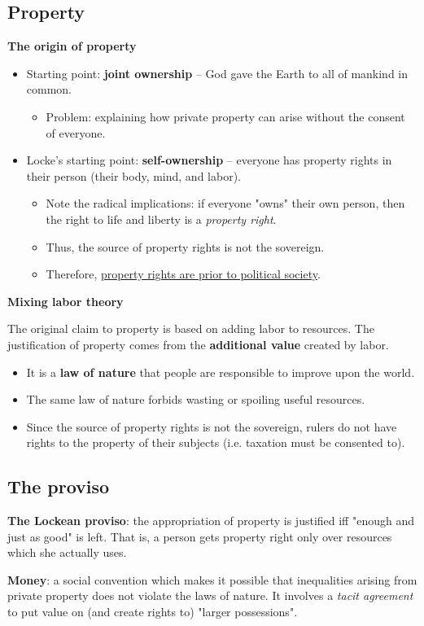 \subsection{Property}

\textbf{The origin of property}

\begin{itemize}
    \item Starting point: \textbf{joint ownership} -- God gave the Earth to all
    of mankind in common.
    \begin{itemize}
        \item Problem: explaining how private property can arise without the
        consent of everyone.
    \end{itemize}
    \item Locke's starting point: \textbf{self-ownership} -- everyone has
    property rights in their person (their body, mind, and labor).
    \begin{itemize}
        \item Note the radical implications: if everyone "owns" their own
        person, then the right to life and liberty is a \textit{property
        right}.
        \item Thus, the source of property rights is not the sovereign.
        \item Therefore, \underline{property rights are prior to political
        society}.
    \end{itemize}
\end{itemize}

\textbf{Mixing labor theory}

The original claim to property is based on adding labor to resources. The
justification of property comes from the \textbf{additional value} created by
labor.

\begin{itemize}
    \item It is a \textbf{law of nature} that people are responsible to improve
    upon the world.
    \item The same law of nature forbids wasting or spoiling useful resources.
    \item Since the source of property rights is not the sovereign, rulers do
    not have rights to the property of their subjects (i.e. taxation must be
    consented to).
\end{itemize}

\subsection{The proviso}

\textbf{The Lockean proviso}: the appropriation of property is justified iff
"enough and just as good" is left. That is, a person gets property right only
over resources which she actually uses.

\textbf{Money}: a social convention which makes it possible that inequalities
arising from private property does not violate the laws of nature. It involves
a \textit{tacit agreement} to put value on (and create rights to)
"larger possessions".

